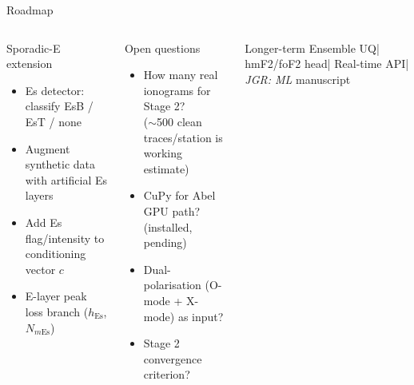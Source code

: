 \documentclass[aspectratio=169,10pt]{beamer}
\begin{document}
\begin{frame}{Roadmap}
\begin{columns}
\begin{block}{Sporadic-E extension}
  \scriptsize
  \begin{itemize}
    \item[$\square$] Es detector: classify EsB / EsT / none
    \item[$\square$] Augment synthetic data with artificial Es layers
    \item[$\square$] Add Es flag/intensity to conditioning vector $c$
    \item[$\square$] E-layer peak loss branch ($h_\mathrm{Es}$, $N_{m\mathrm{Es}}$)
  \end{itemize}
\end{block}
\vspace{3pt}
\begin{alertblock}{Open questions}
  \scriptsize
  \begin{itemize}
    \item How many real ionograms for Stage 2?\\
          ($\sim$500 clean traces/station is working estimate)
    \item CuPy for Abel GPU path? (installed, pending)
    \item Dual-polarisation (O-mode + X-mode) as input?
    \item Stage 2 convergence criterion?
  \end{itemize}
\end{alertblock}
\vspace{3pt}
\begin{exampleblock}{Longer-term}
  \tiny
  Ensemble UQ\quad|\quad
  hmF2/foF2 head\quad|\quad
  Real-time API\quad|\quad
  \textit{JGR: ML} manuscript
\end{exampleblock}
\end{columns}
\end{frame}
\end{document}

